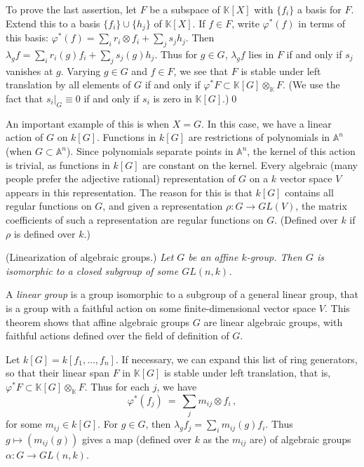 \documentclass[12pt]{amsart}
\begin{document}
To prove the last assertion, let $F$ be a subspace of ${\mathbb K}[X]$
with $\{f_i\}$ a basis for $F$.
Extend this to a basis $\{f_i\}\cup\{h_j\}$ of ${\mathbb K}[X]$.
If $f\in F$, write $\varphi^*(f)$ in terms of this basis:
$\varphi^*(f)=\sum_ir_i\otimes f_i + \sum_j s_j h_j$.
Then $\lambda_gf=\sum_i r_i(g)f_i + \sum_j s_j(g) h_j$.
Thus for $g\in G$, $\lambda_gf$ lies in $F$ if and only if $s_j$ vanishes at 
$g$.
Varying $g\in G$ and $f\in F$, we see that $F$ is stable under left
translation by all elements of $G$ if and only if 
$\varphi^*F\subset {\mathbb K}[G]\otimes_{\mathbb K} F$.
(We use the fact that $s_i|_G\equiv 0$ if and only if $s_i$ is zero in 
${\mathbb K}[G]$.)\qed\medskip


An important example of this is when $X=G$.
In this case, we have a linear action of $G$ on $k[G]$.
Functions in $k[G]$ are restrictions of polynomials in ${\mathbb A}^n$
(when $G\subset {\mathbb A}^n$).
Since polynomials separate points in ${\mathbb A}^n$, the kernel of this
action is trivial, as functions in $k[G]$ are constant on the kernel.
Every algebraic (many people prefer the adjective rational)
representation of $G$ on a $k$ vector space $V$ appears in 
this representation.
The reason for this is that $k[G]$ contains all regular functions on
$G$, and given a representation $\rho\colon G\to GL(V)$, the matrix
coefficients of such a representation are regular functions on $G$.
(Defined over $k$ if $\rho$ is defined over $k$.)
\medskip

(Linearization of algebraic groups.)
{\it
Let $G$ be an affine $k$-group.
Then $G$ is isomorphic to a closed subgroup of some $GL(n,k)$.
}\medskip

A {\sl linear group} is a group isomorphic to a subgroup of a general linear
group, that is a group with a faithful action on some finite-dimensional
vector space $V$. 
This theorem shows that affine algebraic groups $G$ are linear algebraic
groups, with faithful actions defined over the field of definition of $G$. 
\medskip

Let $k[G]=k[f_1,\ldots,f_n]$.
If necessary, we can expand this list of ring generators, so that their
linear span $F$ in ${\mathbb K}[G]$ is stable under left translation, 
that is, $\varphi^* F \subset {\mathbb K}[G]\otimes_{\mathbb K} F$.
Thus for each $j$, we have 
$$
  \varphi^*(f_j)\ =\ \sum_j m_{ij}\otimes f_i\,,
$$ 
for some $m_{ij}\in k[G]$.
For $g\in G$, then $\lambda_g f_j=\sum_i m_{ij}(g) f_i$.
Thus $g\mapsto (m_{ij}(g))$ gives a map (defined over $k$ as the $m_{ij}$
are) of algebraic groups $\alpha\colon G \to GL(n,k)$.
\end{document}
